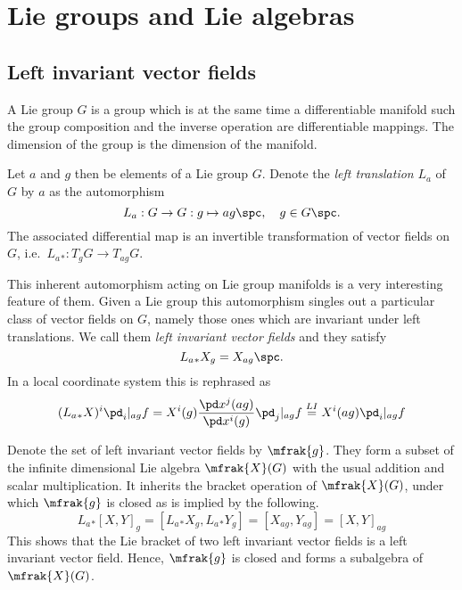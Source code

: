 \documentclass[10pt,reqno]{amsart}
\numberwithin{equation}{section}
\begin{document}
\section{Lie groups and Lie algebras}

\subsection{Left invariant vector fields}

\begin{definition}
	A Lie group $G$ is a group which is at the same time a 
	differentiable manifold such the group composition and the 
	inverse operation are differentiable mappings. The dimension of 
	the group is the dimension of the manifold.
\end{definition}
%

Let $a$ and $g$ then be elements of a Lie group $G$. Denote the 
\emph{left translation} $L_a$ of $G$ by $a$ as the automorphism
%
\begin{equation}
	L_a : G \rightarrow G : g \mapsto ag\spc, \quad g \in G\spc.
\end{equation}
%
The associated differential map is an invertible transformation 
of vector fields on $G$, i.e.\ $L_a{}_\ast : T_g G \rightarrow 
T_{ag}G$.

This inherent automorphism acting on Lie group manifolds is a 
very interesting feature of them. Given a Lie group this 
automorphism singles out a particular class of vector fields on 
$G$, namely those ones which are invariant under left 
translations. We call them \emph{left invariant vector fields} 
and they satisfy
%
\begin{equation}\label{eq:LIvector}
	L_a{}_\ast X_g = X_{ag}\spc.
\end{equation}
%
In a local coordinate system this is rephrased as
%
\begin{equation}\label{eq:LIvectorLC}
	(L_a{}_\ast X)^i\pd_i|_{ag} f = X^i(g) \frac{\pd x^j(ag)}{\pd 
		x^i(g)}\pd_j|_{ag} f \overset{LI}{=} X^i(ag)\pd_i|_{ag} f
\end{equation}

Denote the set of left invariant vector fields by $\mfrak{g}$.  
They form a subset of the infinite dimensional Lie algebra 
$\mfrak{X}(G)$ with the usual addition and scalar multiplication.  
It inherits the bracket operation of $\mfrak{X}(G)$, under which 
$\mfrak{g}$ is closed as is implied by the following.
%
\begin{equation}
	L_a{}_\ast [X,Y]_g = [L_a{}_\ast X_g,L_a{}_\ast Y_g]
	= [X_{ag},Y_{ag}]
		= [X,Y]_{ag}
\end{equation}
%
This shows that the Lie bracket of two left invariant vector 
fields is a left invariant vector field. Hence, $\mfrak{g}$ is 
closed and forms a subalgebra of $\mfrak{X}(G)$.
\end{document}
